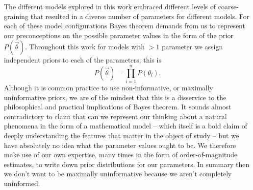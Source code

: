The different models explored in this work embraced different levels of
coarse-graining that resulted in a diverse number of parameters for different
models. For each of these model configurations Bayes theorem demands from us to
represent our preconceptions on the possible parameter values in the form of the
prior $P(\vec{\theta})$. Throughout this work for models with $> 1$ parameter we
assign independent priors to each of the parameters; this is
\begin{equation}
P(\vec{\theta}) = \prod_{i=1}^n P(\theta_i).
\end{equation}
Although it is common practice to use non-informative, or maximally
uninformative priors, we are of the mindset that this is a disservice to the
philosophical and practical implications of Bayes theorem. It sounds almost
contradictory to claim that can we represent our thinking about a natural
phenomena in the form of a mathematical model -- which itself is a bold claim of
deeply understanding the features that matter in the object of study -- but we
have absolutely no idea what the parameter values ought to be. We therefore make
use of our own expertise, many times in the form of order-of-magnitude
estimates, to write down prior distributions for our parameters. In summary then
we don’t want to be maximally uninformative because we aren’t completely
uninformed.


